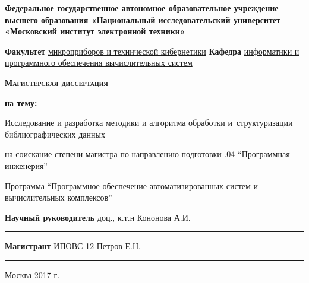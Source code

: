 \newpage

\begin{center}
{\small \textbf{Федеральное государственное автономное образовательное учреждение высшего образования
«Национальный исследовательский университет «Московский институт электронной техники»}}
\end{center}

\begin{flushleft}
{\small \textbf{Факультет} \underline{микроприборов и технической кибернетики}} \linebreak
{\small \textbf{Кафедра} \underline{информатики и программного обеспечения вычислительных систем}}
\end{flushleft}

\vspace{1em}

\begin{center}
\textsc{\textbf{Магистерская диссертация}}
\end{center}

\begin{center}
\textbf{на тему:}
\end{center}

\vspace{1.0em}

\begin{center}
Исследование и разработка методики и алгоритма обработки и~структуризации библиографических данных
\end{center}

\vspace{1em}

\begin{center}
на соискание степени магистра по направлению подготовки .04 “Программная инженерия”
\end{center}

\begin{center}
Программа “Программное обеспечение автоматизированных систем и \linebreak
вычислительных комплексов”
\end{center}

\vspace{\fill}

\begin{flushright}
\textbf{Научный руководитель} доц., к.т.н \linebreak
Кононова А.И. \linebreak
\rule{5cm}{.1pt}

\vspace{1em}

\textbf{Магистрант} ИПОВС-12 \linebreak
Петров Е.Н. \linebreak
\rule{5cm}{.1pt}
\end{flushright}

\begin{center}
Москва 2017 г.
\end{center}

\thispagestyle{empty}